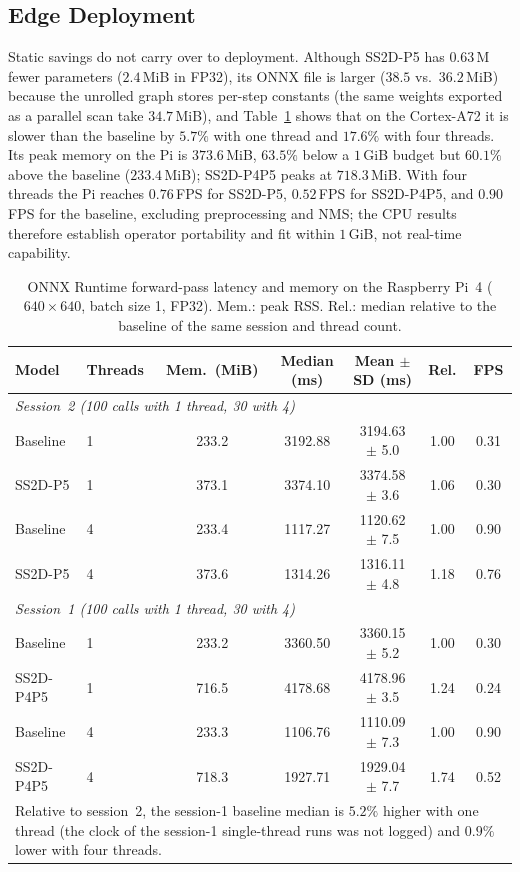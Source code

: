 \subsection{Edge Deployment}
\label{sec:res_edge}
Static savings do not carry over to deployment. Although SS2D-P5 has $0.63$\,M fewer parameters ($2.4$\,MiB in FP32), its ONNX file is larger ($38.5$ vs.\ $36.2$\,MiB) because the unrolled graph stores per-step constants (the same weights exported as a parallel scan take $34.7$\,MiB), and Table~\ref{tab:edge_runtime} shows that on the Cortex-A72 it is slower than the baseline by $5.7\%$ with one thread and $17.6\%$ with four threads. Its peak memory on the Pi is $373.6$\,MiB, $63.5\%$ below a $1$\,GiB budget but $60.1\%$ above the baseline ($233.4$\,MiB); SS2D-P4P5 peaks at $718.3$\,MiB. With four threads the Pi reaches $0.76$\,FPS for SS2D-P5, $0.52$\,FPS for SS2D-P4P5, and $0.90$\,FPS for the baseline, excluding preprocessing and NMS; the CPU results therefore establish operator portability and fit within $1$\,GiB, not real-time capability.

\begin{table}[t]
\caption{ONNX Runtime forward-pass latency and memory on the Raspberry Pi~4 ($640 \times 640$, batch size 1, FP32). Mem.: peak RSS. Rel.: median relative to the baseline of the same session and thread count.}
\label{tab:edge_runtime}
\centering
\footnotesize
\setlength{\tabcolsep}{3pt}
\begin{tabular}{llccccc}
\toprule
\textbf{Model} & \textbf{Threads} & \textbf{Mem.\ (MiB)} & \textbf{Median (ms)} & \textbf{Mean $\pm$ SD (ms)} & \textbf{Rel.} & \textbf{FPS} \\
\midrule
\multicolumn{7}{l}{\textit{Session~2 (100 calls with 1 thread, 30 with 4)}} \\
Baseline & 1 & 233.2 & 3192.88 & 3194.63 $\pm$ 5.0 & 1.00 & 0.31 \\
SS2D-P5 & 1 & 373.1 & 3374.10 & 3374.58 $\pm$ 3.6 & 1.06 & 0.30 \\
Baseline & 4 & 233.4 & 1117.27 & 1120.62 $\pm$ 7.5 & 1.00 & 0.90 \\
SS2D-P5 & 4 & 373.6 & 1314.26 & 1316.11 $\pm$ 4.8 & 1.18 & 0.76 \\
\midrule
\multicolumn{7}{l}{\textit{Session~1 (100 calls with 1 thread, 30 with 4)}} \\
Baseline & 1 & 233.2 & 3360.50 & 3360.15 $\pm$ 5.2 & 1.00 & 0.30 \\
SS2D-P4P5 & 1 & 716.5 & 4178.68 & 4178.96 $\pm$ 3.5 & 1.24 & 0.24 \\
Baseline & 4 & 233.3 & 1106.76 & 1110.09 $\pm$ 7.3 & 1.00 & 0.90 \\
SS2D-P4P5 & 4 & 718.3 & 1927.71 & 1929.04 $\pm$ 7.7 & 1.74 & 0.52 \\
\bottomrule
\multicolumn{7}{p{0.95\textwidth}}{\scriptsize Relative to session~2, the session-1 baseline median is $5.2\%$ higher with one thread (the clock of the session-1 single-thread runs was not logged) and $0.9\%$ lower with four threads.} \\
\end{tabular}
\end{table}

